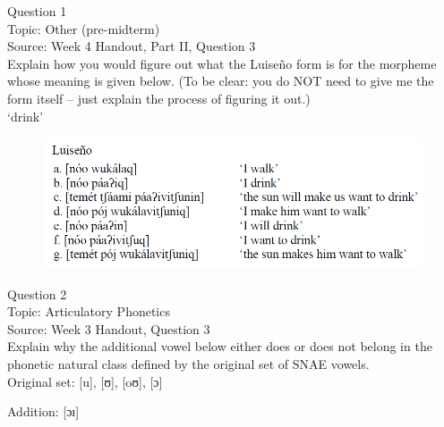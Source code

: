 \documentclass[12pt]{article}
\begin{document}
\begin{center}
\textbf{{\color{blue}{\HUGE START OF EXAM\\}}}

\textbf{{\color{blue}{\HUGE Student ID: 24476\\}}}

\textbf{{\color{blue}{\HUGE 4:50\\}}}

\end{center}
\newpage

{\large Question 1}\\

Topic: Other (pre-midterm)\\
Source: Week 4 Handout, Part II, Question 3\\

Explain how you would figure out what the Luiseño form is for the morpheme whose meaning is given below. (To be clear: you do NOT need to give me the form itself -- just explain the process of figuring it out.)\\

‘drink’

\begin{figure}[H]
\includegraphics{../images/luiseno.png}
\end{figure}

\newpage

{\large Question 2}\\

Topic: Articulatory Phonetics\\
Source: Week 3 Handout, Question 3\\

Explain why the additional vowel below either does or does not belong in the phonetic natural class defined by the original set of SNAE vowels.\\

Original set: {[u]}, {[ʊ]}, {[oʊ]}, {[ɔ]}

Addition: {[ɔɪ]}


\newpage

\begin{center}
\textbf{{\color{red}{\HUGE END OF EXAM}}}\\

\end{center}
\newpage
\end{document}
